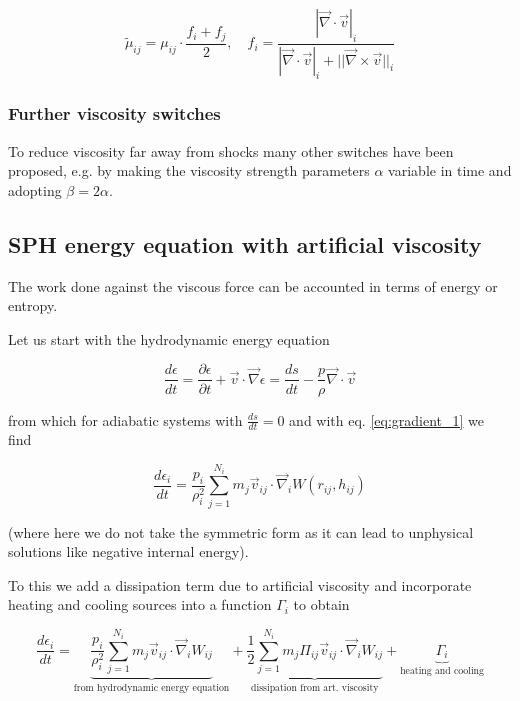 \begin{equation}
    \tilde{\mu}_{ij} = \mu_{ij} \cdot \frac{f_i + f_j}{2}, \quad f_i = \frac{|\vec{\nabla}\cdot \vec{v}|_i}{|\vec{\nabla}\cdot \vec{v}|_i + ||\vec{\nabla} \times \vec{v}||_i}
\end{equation}

\subsubsection{Further viscosity switches}
To reduce viscosity far away from shocks many other switches have been proposed,
e.g. by making the viscosity strength parameters $\alpha$ variable in time and adopting $\beta = 2 \alpha$.


\subsection{SPH energy equation with artificial viscosity}
The work done against the viscous force can be accounted in terms of energy or entropy.

Let us start with the hydrodynamic energy equation

\begin{equation}
    \frac{d \epsilon}{d t}=\frac{\partial \epsilon}{\partial t}+\vec{v} \cdot \vec{\nabla} \epsilon=\frac{d s}{d t}-\frac{p}{\rho} \vec{\nabla} \cdot \vec{v}
\end{equation}

from which for adiabatic systems with $\frac{d s}{d t}=0$ and with eq. \ref{eq:gradient_1} we find

\begin{equation}
    \frac{d \epsilon_i}{d t}=\frac{p_i}{\rho_i^2} \sum_{j=1}^{N_i} m_j \vec{v}_{i j} \cdot \vec{\nabla}_i W\left(r_{i j}, h_{i j}\right)
\end{equation}

(where here we do not take the symmetric form as it can lead to unphysical solutions like negative internal energy).

To this we add a dissipation term due to artificial viscosity and incorporate
heating and cooling sources into a function $\Gamma_i$ to obtain

\begin{equation}
    \boxed{\frac{d \epsilon_i}{d t}=\underbrace{\frac{p_i}{\rho_i^2} \sum_{j=1}^{N_i} m_j \vec{v}_{i j} \cdot \vec{\nabla}_i W_{i j}}_{\text{from hydrodynamic energy equation}}+\underbrace{\frac{1}{2} \sum_{j=1}^{N_i} m_j \Pi_{i j} \vec{v}_{i j} \cdot \vec{\nabla}_i W_{i j}}_{\text{dissipation from art. viscosity}}+\underbrace{\Gamma_i}_{\text{heating and cooling}}}
\end{equation}

